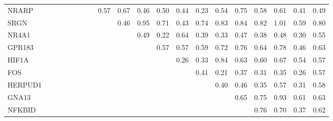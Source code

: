 \begin{longtable}{lrrrrrrrrrrrrrrrrrrr}
NRARP   &             &             &             &            &            &             &             &       0.57 &        0.67 &         0.46 &        0.50 &      0.44 &          0.23 &        0.54 &         0.75 &        0.58 &        0.61 &        0.41 &       0.49 \\
SRGN    &             &             &             &            &            &             &             &            &        0.46 &         0.95 &        0.71 &      0.43 &          0.74 &        0.83 &         0.84 &        0.82 &        1.01 &        0.59 &       0.80 \\
NR4A1   &             &             &             &            &            &             &             &            &             &         0.49 &        0.22 &      0.64 &          0.39 &        0.33 &         0.47 &        0.38 &        0.48 &        0.30 &       0.55 \\
GPR183  &             &             &             &            &            &             &             &            &             &              &        0.57 &      0.57 &          0.59 &        0.72 &         0.76 &        0.64 &        0.78 &        0.46 &       0.63 \\
HIF1A   &             &             &             &            &            &             &             &            &             &              &             &      0.26 &          0.33 &        0.84 &         0.63 &        0.60 &        0.67 &        0.54 &       0.57 \\
FOS     &             &             &             &            &            &             &             &            &             &              &             &           &          0.41 &        0.21 &         0.37 &        0.31 &        0.35 &        0.26 &       0.57 \\
HERPUD1 &             &             &             &            &            &             &             &            &             &              &             &           &               &        0.40 &         0.46 &        0.35 &        0.57 &        0.31 &       0.58 \\
GNA13   &             &             &             &            &            &             &             &            &             &              &             &           &               &             &         0.65 &        0.75 &        0.93 &        0.61 &       0.63 \\
NFKBID  &             &             &             &            &            &             &             &            &             &              &             &           &               &             &              &        0.76 &        0.70 &        0.37 &       0.62 \\

\end{longtable}
